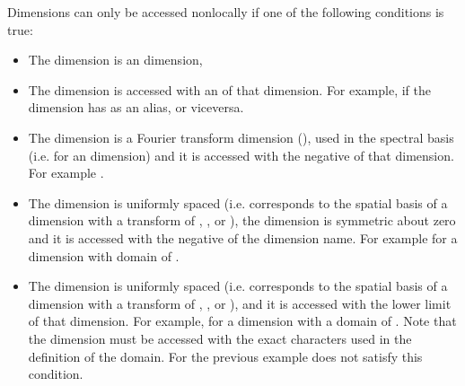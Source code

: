 \documentclass[letterpaper,10pt,english]{sphinxmanual}
\begin{document}
\sphinxAtStartPar
Dimensions can only be accessed non\sphinxhyphen{}locally if one of the following conditions is true:
\begin{itemize}
\item {} 
\sphinxAtStartPar
The dimension is an  dimension,

\item {} 
\sphinxAtStartPar
The dimension is accessed with an {\hyperref[\detokenize{advanced_topics:dimensionaliases}]{}} of that dimension. For example,  if the dimension  has  as an alias, or vice\sphinxhyphen{}versa.

\item {} 
\sphinxAtStartPar
The dimension is a Fourier transform dimension (), used in the spectral basis (i.e.  for an  dimension) and it is accessed with the negative of that dimension.  For example .

\item {} 
\sphinxAtStartPar
The dimension is uniformly spaced (i.e. corresponds to the spatial basis of a dimension with a transform of , ,  or ), the dimension is symmetric about zero and it is accessed with the negative of the dimension name.  For example  for a dimension with domain of .

\item {} 
\sphinxAtStartPar
The dimension is uniformly spaced (i.e. corresponds to the spatial basis of a dimension with a transform of , ,  or ), and it is accessed with the lower limit of that dimension.  For example,  for a dimension with a domain of .  Note that the dimension must be accessed with the exact characters used in the definition of the domain.  For the previous example  does not satisfy this condition.


\end{itemize}
\end{document}
